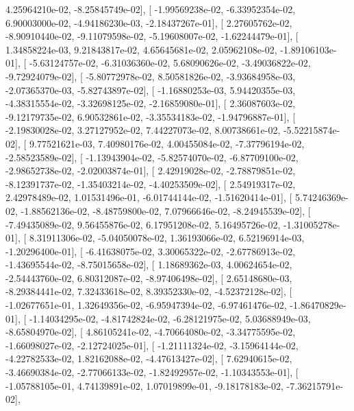 \documentclass{article}
\begin{document}
          4.25964210e-02,  -8.25845749e-02],
       [ -1.99569238e-02,  -6.33952354e-02,   6.90003000e-02,
         -4.94186230e-03,  -2.18437267e-01],
       [  2.27605762e-02,  -8.90910440e-02,  -9.11079598e-02,
         -5.19608007e-02,  -1.62244479e-01],
       [  1.34858224e-03,   9.21843817e-02,   4.65645681e-02,
          2.05962108e-02,  -1.89106103e-01],
       [ -5.63124757e-02,  -6.31036360e-02,   5.68090626e-02,
         -3.49036822e-02,  -9.72924079e-02],
       [ -5.80772978e-02,   8.50581826e-02,  -3.93684958e-03,
         -2.07365370e-03,  -5.82743897e-02],
       [ -1.16880253e-03,   5.94420355e-03,  -4.38315554e-02,
         -3.32698125e-02,  -2.16859080e-01],
       [  2.36087603e-02,  -9.12179735e-02,   6.90532861e-02,
         -3.35534183e-02,  -1.94796887e-01],
       [ -2.19830028e-02,   3.27127952e-02,   7.44227073e-02,
          8.00738661e-02,  -5.52215874e-02],
       [  9.77521621e-03,   7.40980176e-02,   4.00455084e-02,
         -7.37796194e-02,  -2.58523589e-02],
       [ -1.13943904e-02,  -5.82574070e-02,  -6.87709100e-02,
         -2.98652738e-02,  -2.02003874e-01],
       [  2.42919028e-02,  -2.78879851e-02,  -8.12391737e-02,
         -1.35403214e-02,  -4.40253509e-02],
       [  2.54919317e-02,   2.42978489e-02,   1.01531496e-01,
         -6.01744144e-02,  -1.51620414e-01],
       [  5.74246369e-02,  -1.88562136e-02,  -8.48759800e-02,
          7.07966646e-02,  -8.24945539e-02],
       [ -7.49435089e-02,   9.56455876e-02,   6.17951208e-02,
          5.16495726e-02,  -1.31005278e-01],
       [  8.31911306e-02,  -5.04050078e-02,   1.36193066e-02,
          6.52196914e-03,  -1.20296400e-01],
       [ -6.41638075e-02,   3.30065322e-02,  -2.67786913e-02,
         -1.43695544e-02,  -8.75015658e-02],
       [  1.18689362e-03,   4.00624654e-02,  -2.54443760e-02,
          6.80312087e-02,  -8.97406498e-02],
       [  2.65148680e-03,  -8.29384441e-02,   7.32433618e-02,
          8.39352330e-02,  -4.52372128e-02],
       [ -1.02677651e-01,   1.32649356e-02,  -6.95947394e-02,
         -6.97461476e-02,  -1.86470829e-01],
       [ -1.14034295e-02,  -4.81742824e-02,  -6.28121975e-02,
          5.03688949e-03,  -8.65804970e-02],
       [  4.86105241e-02,  -4.70664080e-02,  -3.34775595e-02,
         -1.66098027e-02,  -2.12724025e-01],
       [ -1.21111324e-02,  -3.15964144e-02,  -4.22782533e-02,
          1.82162088e-02,  -4.47613427e-02],
       [  7.62940615e-02,  -3.46690384e-02,  -2.77066133e-02,
         -1.82492957e-02,  -1.10343553e-01],
       [ -1.05788105e-01,   4.74139891e-02,   1.07019899e-01,
         -9.18178183e-02,  -7.36215791e-02],
\end{document}
